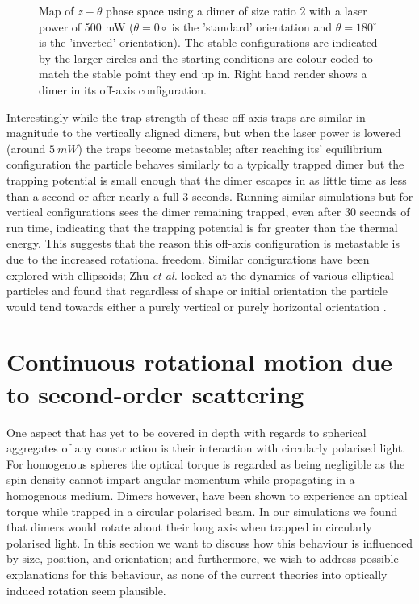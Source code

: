 \begin{figure}[h!]
\begin{subfigure}{0.32\linewidth}
		\caption{}
	\end{subfigure}
	\caption{Map of $z-\theta$ phase space using a dimer of size ratio 2 with 
		a laser power of 500 mW ($\theta=0\circ$ is the 'standard' orientation 
		and $\theta=180^\circ$ is the 'inverted' orientation). The stable 
		configurations are indicated by the larger circles and the starting 
		conditions are colour coded to match the stable point they end up in. 
		Right hand render shows a dimer in its off-axis configuration.}
	\label{fig:off_axis}
\end{figure}

Interestingly while the trap strength of these off-axis traps are similar 
in magnitude to the vertically aligned dimers, but when the laser power 
is lowered (around $5\ mW$) the traps become metastable; after reaching its'
equilibrium configuration the particle behaves similarly to a typically
trapped dimer but the trapping potential is small enough that the dimer
escapes in as little time as less than a second or after nearly a full 
3 seconds. Running similar simulations but for vertical configurations 
sees the dimer remaining trapped, even after 30 seconds of run time, 
indicating that the trapping potential is far greater than the thermal 
energy. This suggests that the reason this off-axis configuration is 
metastable is due to the increased rotational freedom. Similar 
configurations have been explored with ellipsoids; Zhu \textit{et al.} 
looked at the dynamics of various elliptical particles and found that 
regardless of shape or initial orientation the particle would tend towards
either a purely vertical or purely horizontal orientation \cite{Zhu2021}. 

\section{Continuous rotational motion due to second-order scattering}
One aspect that has yet to be covered in depth with regards to spherical 
aggregates of any construction is their interaction with circularly 
polarised light. For homogenous spheres the optical torque is regarded as
being negligible as the spin density cannot impart angular momentum while 
propagating in a homogenous medium. Dimers however, have been shown to
experience an optical torque \cite{Vigilante2020, Ahn2018, Reimann2018} 
while trapped in a circular polarised beam. In our simulations we found 
that dimers would rotate about their long axis when trapped in circularly
polarised light. In this section we want to discuss how this behaviour 
is influenced by size, position, and orientation; and furthermore, we wish
to address possible explanations for this behaviour, as none of the current
theories into optically induced rotation seem plausible.

